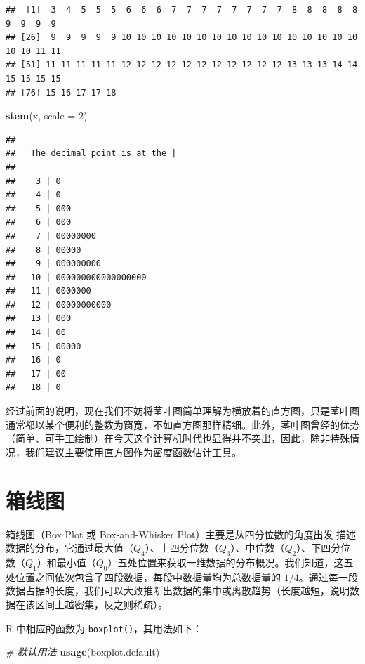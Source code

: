 \documentclass[
  b5paper,
  UTF8,twoside]{book}
\newenvironment{Shaded}{\begin{snugshade}}{\end{snugshade}}
\newcommand{\AttributeTok}[1]{\textcolor[rgb]{0.13,0.29,0.53}{#1}}
\newcommand{\CommentTok}[1]{\textcolor[rgb]{0.56,0.35,0.01}{\textit{#1}}}
\newcommand{\DecValTok}[1]{\textcolor[rgb]{0.00,0.00,0.81}{#1}}
\newcommand{\FunctionTok}[1]{\textcolor[rgb]{0.13,0.29,0.53}{\textbf{#1}}}
\newcommand{\NormalTok}[1]{#1}
\begin{document}
\begin{verbatim}
##  [1]  3  4  5  5  5  6  6  6  7  7  7  7  7  7  7  7  8  8  8  8  8  9  9  9  9
## [26]  9  9  9  9  9 10 10 10 10 10 10 10 10 10 10 10 10 10 10 10 10 10 10 11 11
## [51] 11 11 11 11 11 12 12 12 12 12 12 12 12 12 12 12 13 13 13 14 14 15 15 15 15
## [76] 15 16 17 17 18
\end{verbatim}

\begin{Shaded}
\begin{Highlighting}[]
\FunctionTok{stem}\NormalTok{(x, }\AttributeTok{scale =} \DecValTok{2}\NormalTok{)}
\end{Highlighting}
\end{Shaded}

\begin{verbatim}
## 
##   The decimal point is at the |
## 
##    3 | 0
##    4 | 0
##    5 | 000
##    6 | 000
##    7 | 00000000
##    8 | 00000
##    9 | 000000000
##   10 | 000000000000000000
##   11 | 0000000
##   12 | 00000000000
##   13 | 000
##   14 | 00
##   15 | 00000
##   16 | 0
##   17 | 00
##   18 | 0
\end{verbatim}

经过前面的说明，现在我们不妨将茎叶图简单理解为横放着的直方图，只是茎叶图通常都以某个便利的整数为窗宽，不如直方图那样精细。此外，茎叶图曾经的优势（简单、可手工绘制）在今天这个计算机时代也显得并不突出，因此，除非特殊情况，我们建议主要使用直方图作为密度函数估计工具。

\section{箱线图}\label{sec:boxplot}

箱线图（Box Plot 或 Box-and-Whisker Plot）主要是从四分位数的角度出发
描述数据的分布，它通过最大值（\(Q_4\)）、上四分位数（\(Q_3\)）、中位数（\(Q_2\)）、下四分位数（\(Q_1\)）和最小值（\(Q_0\)）五处位置来获取一维数据的分布概况。我们知道，这五处位置之间依次包含了四段数据，每段中数据量均为总数据量的 \(1/4\)。通过每一段数据占据的长度，我们可以大致推断出数据的集中或离散趋势（长度越短，说明数据在该区间上越密集，反之则稀疏）。

R 中相应的函数为 \texttt{boxplot()}，其用法如下：

\begin{Shaded}
\begin{Highlighting}[]
\CommentTok{\# 默认用法}
\FunctionTok{usage}\NormalTok{(boxplot.default)}
\end{Highlighting}
\end{Shaded}
\end{document}
